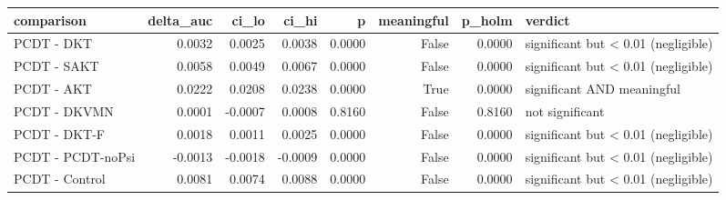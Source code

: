 \begin{tabular}{lrrrrrrl}
\toprule
comparison & delta\_auc & ci\_lo & ci\_hi & p & meaningful & p\_holm & verdict \\
\midrule
PCDT - DKT & 0.0032 & 0.0025 & 0.0038 & 0.0000 & False & 0.0000 & significant but < 0.01 (negligible) \\
PCDT - SAKT & 0.0058 & 0.0049 & 0.0067 & 0.0000 & False & 0.0000 & significant but < 0.01 (negligible) \\
PCDT - AKT & 0.0222 & 0.0208 & 0.0238 & 0.0000 & True & 0.0000 & significant AND meaningful \\
PCDT - DKVMN & 0.0001 & -0.0007 & 0.0008 & 0.8160 & False & 0.8160 & not significant \\
PCDT - DKT-F & 0.0018 & 0.0011 & 0.0025 & 0.0000 & False & 0.0000 & significant but < 0.01 (negligible) \\
PCDT - PCDT-noPsi & -0.0013 & -0.0018 & -0.0009 & 0.0000 & False & 0.0000 & significant but < 0.01 (negligible) \\
PCDT - Control & 0.0081 & 0.0074 & 0.0088 & 0.0000 & False & 0.0000 & significant but < 0.01 (negligible) \\
\bottomrule
\end{tabular}
